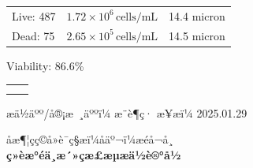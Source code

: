 \documentclass[UTF8,10pt,a4paper,fontset=fandol]{ctexart}
\newcommand{\fieldvalue}[1]{#1}
\newcommand{\handwritten}[1]{#1}
\begin{document}
\begin{center}
\begin{center}
\begin{tabularx}{\textwidth}{@{}XXX@{}}
Live:
\fieldvalue{487}
&
\fieldvalue{\(1.72\times 10^{6}\,\mathrm{cells/mL}\)}
&
\fieldvalue{14.4 micron}
\\

Dead:
\fieldvalue{75}
&
\fieldvalue{\(2.65\times 10^{5}\,\mathrm{cells/mL}\)}
&
\fieldvalue{14.5 micron}
\\
\end{tabularx}

Viability:
\fieldvalue{86.6\%}

\vspace{1em}

\begin{center}
\begin{tabular}{cc}
\fbox{\rule{0pt}{0.27\textwidth}\rule{0.43\textwidth}{0pt}}
&
\fbox{\rule{0pt}{0.27\textwidth}\rule{0.43\textwidth}{0pt}}
\\[1em]
\fbox{\rule{0pt}{0.27\textwidth}\rule{0.43\textwidth}{0pt}}
&
\fbox{\rule{0pt}{0.27\textwidth}\rule{0.43\textwidth}{0pt}}
\end{tabular}
\end{center}

\vfill

æä½äºº/å®¡æ ¸äººï¼
\fieldvalue{\handwritten{æ¨è¶ç·}}
\hfill
æ¥æï¼
\fieldvalue{\handwritten{2025.01.29}}

\newpage

\begin{center}
\small
åæ¶¦çç©å»è¯ç§æï¼åäº¬ï¼æéå¬å¸\\
\textbf{ç»èæ°éä¸æ´»çæ£æµæä½è®°å½}\\
\end{center}


\end{center}
\end{center}
\end{document}
